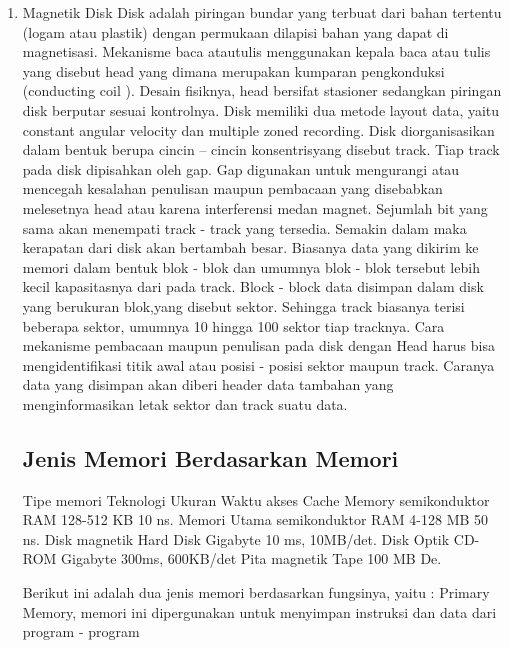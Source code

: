 \documentclass{article}
\begin{document}
\begin{enumerate}
\item Magnetik Disk  Disk adalah piringan bundar yang terbuat dari bahan tertentu (logam atau plastik) dengan permukaan dilapisi bahan yang dapat di magnetisasi. Mekanisme baca atautulis menggunakan kepala baca atau tulis yang disebut head yang dimana merupakan kumparan pengkonduksi (conducting coil ). Desain fisiknya, head bersifat stasioner sedangkan piringan disk berputar sesuai kontrolnya. Disk memiliki dua metode layout data, yaitu  constant angular velocity dan multiple zoned recording. Disk diorganisasikan dalam bentuk berupa cincin – cincin
konsentrisyang disebut track. Tiap track pada disk dipisahkan oleh gap. Gap digunakan untuk mengurangi atau mencegah kesalahan penulisan maupun pembacaan yang disebabkan melesetnya head atau karena interferensi medan magnet. Sejumlah bit yang sama akan menempati track - track yang tersedia. Semakin dalam maka kerapatan dari disk akan bertambah besar. Biasanya data yang dikirim ke memori dalam bentuk blok - blok dan umumnya blok - blok tersebut lebih kecil kapasitasnya dari pada track. Block - block data disimpan dalam disk yang berukuran blok,yang disebut sektor. Sehingga track biasanya terisi beberapa sektor, umumnya 10 hingga 100 sektor tiap tracknya. Cara mekanisme pembacaan maupun penulisan pada disk dengan Head harus bisa mengidentifikasi titik awal atau posisi - posisi sektor maupun track. Caranya data yang disimpan akan diberi header data tambahan yang menginformasikan letak sektor dan track suatu data.  


\subsection {Jenis Memori Berdasarkan Memori}

 
Tipe memori Teknologi Ukuran Waktu akses Cache Memory semikonduktor RAM 128-512 KB 10 ns. Memori Utama semikonduktor RAM 4-128 MB 50 ns. Disk magnetik Hard Disk Gigabyte 10 ms, 10MB/det. Disk Optik CD-ROM Gigabyte 300ms, 600KB/det Pita magnetik Tape 100 MB De.

Berikut ini adalah dua jenis memori berdasarkan fungsinya, yaitu :
Primary Memory, memori ini dipergunakan untuk menyimpan instruksi dan data dari program - program 














\end{enumerate}
\end{document}
